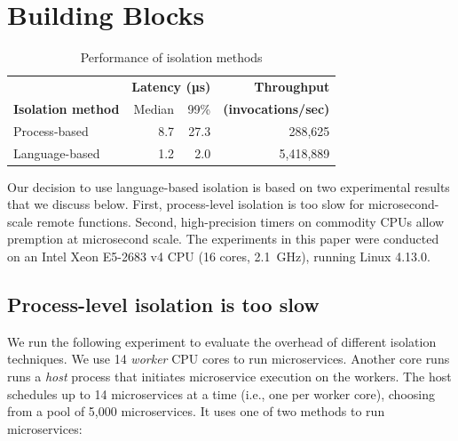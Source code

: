 \section{Building Blocks}
\label{sec:motive}

\begin{table}
\begin{center}
\small
\begin{tabular}{lrrr}
   & \multicolumn{2}{c}{\textbf{Latency (µs)}} & \textbf{Throughput} \\
  \textbf{Isolation method} & Median & 99\% & \textbf{(invocations/sec)} \\
\midrule
Process-based & 8.7 & 27.3 & 288,625 \\
Language-based & 1.2 & 2.0 & 5,418,889 \\
\end{tabular}
\caption{Performance of isolation methods}
\label{tab:isolation_methods}
\end{center}
\end{table}

Our decision to use language-based isolation is based on two experimental
results that we discuss below. First, process-level isolation is too slow for
microsecond-scale remote functions. Second, high-precision timers on commodity
CPUs allow premption at microsecond scale. The experiments in this paper were
conducted on an Intel Xeon E5-2683 v4 CPU (16 cores, 2.1~GHz), running
Linux 4.13.0.

\subsection{Process-level isolation is too slow}
We run the following experiment to evaluate the overhead of different isolation
techniques. We use 14 \emph{worker} CPU cores to run microservices. Another core runs
runs a \emph{host} process that initiates microservice execution on the workers.
The host schedules up to 14 microservices at a time (i.e., one
per worker core), choosing from a pool of 5,000 microservices. It uses one of two
methods to run microservices:

